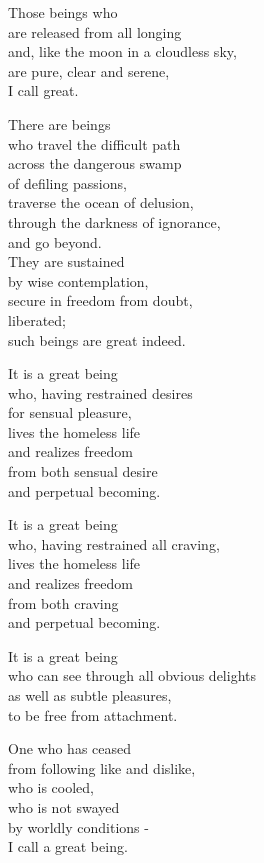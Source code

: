 Those beings who\\
are released from all longing\\
and, like the moon in a cloudless sky,\\
are pure, clear and serene,\\
I call great.


There are beings\\
who travel the difficult path\\
across the dangerous swamp\\
of defiling passions,\\
traverse the ocean of delusion,\\
through the darkness of ignorance,\\
and go beyond.\\
They are sustained\\
by wise contemplation,\\
secure in freedom from doubt,\\
liberated;\\
such beings are great indeed.


It is a great being\\
who, having restrained desires\\
for sensual pleasure,\\
lives the homeless life\\
and realizes freedom\\
from both sensual desire\\
and perpetual becoming.


It is a great being\\
who, having restrained all craving,\\
lives the homeless life\\
and realizes freedom\\
from both craving\\
and perpetual becoming.


It is a great being\\
who can see through all obvious delights\\
as well as subtle pleasures,\\
to be free from attachment.


One who has ceased \\
from following like and dislike,\\
who is cooled,\\
who is not swayed \\
by worldly conditions -\\
I call a great being.


